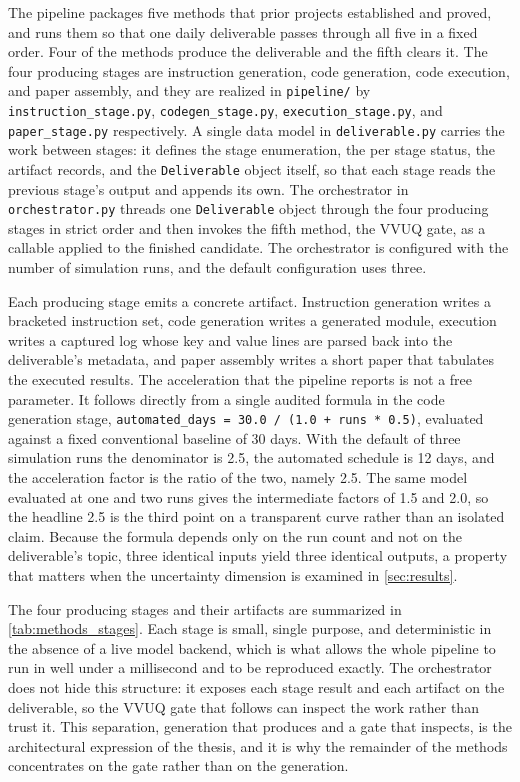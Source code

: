The pipeline packages five methods that prior projects established and proved,
and runs them so that one daily deliverable passes through all five in a fixed
order. Four of the methods produce the deliverable and the fifth clears it. The
four producing stages are instruction generation, code generation, code
execution, and paper assembly, and they are realized in \texttt{pipeline/} by
\texttt{instruction\_stage.py}, \texttt{codegen\_stage.py},
\texttt{execution\_stage.py}, and \texttt{paper\_stage.py} respectively. A single
data model in \texttt{deliverable.py} carries the work between stages: it defines
the stage enumeration, the per stage status, the artifact records, and the
\texttt{Deliverable} object itself, so that each stage reads the previous stage's
output and appends its own. The orchestrator in \texttt{orchestrator.py} threads
one \texttt{Deliverable} object through the four producing stages in strict order
and then invokes the fifth method, the VVUQ gate, as a callable applied to the
finished candidate. The orchestrator is configured with the number of simulation
runs, and the default configuration uses three.

Each producing stage emits a concrete artifact. Instruction generation writes a
bracketed instruction set, code generation writes a generated module, execution
writes a captured log whose key and value lines are parsed back into the
deliverable's metadata, and paper assembly writes a short paper that tabulates
the executed results. The acceleration that the pipeline reports is not a free
parameter. It follows directly from a single audited formula in the code
generation stage, \texttt{automated\_days = 30.0 / (1.0 + runs * 0.5)}, evaluated
against a fixed conventional baseline of 30 days. With the default of three
simulation runs the denominator is 2.5, the automated schedule is 12 days, and
the acceleration factor is the ratio of the two, namely 2.5. The same model
evaluated at one and two runs gives the intermediate factors of 1.5 and 2.0, so
the headline 2.5 is the third point on a transparent curve rather than an
isolated claim. Because the formula depends only on the run count and not on the
deliverable's topic, three identical inputs yield three identical outputs, a
property that matters when the uncertainty dimension is examined in
\autoref{sec:results}.

The four producing stages and their artifacts are summarized in
\autoref{tab:methods_stages}. Each stage is small, single purpose, and
deterministic in the absence of a live model backend, which is what allows the
whole pipeline to run in well under a millisecond and to be reproduced exactly.
The orchestrator does not hide this structure: it exposes each stage result and
each artifact on the deliverable, so the VVUQ gate that follows can inspect the
work rather than trust it. This separation, generation that produces and a gate
that inspects, is the architectural expression of the thesis, and it is why the
remainder of the methods concentrates on the gate rather than on the generation.

